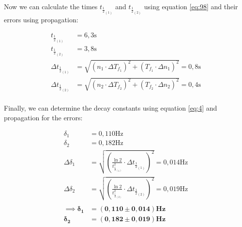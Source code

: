 \documentclass{article}
\begin{document}
Now we can calculate the times $t_{\frac{1}{2}_{(1)}}$ and $t_{\frac{1}{2}_{(2)}}$ using equation \ref{eq:98} and their errors using propagation:

\begin{equation}
    \begin{split}
        t_{\frac{1}{2}_{(1)}} &= 6,3 \text{s} \\
        t_{\frac{1}{2}_{(2)}} &= 3,8 \text{s} \\
        \Delta t_{\frac{1}{2}_{(1)}} &= \sqrt{(n_1 \cdot \Delta T_{f_1})^2 + (T_{f_1} \cdot \Delta n_1)^2} = 0,8 \text{s} \\
        \Delta t_{\frac{1}{2}_{(2)}} &= \sqrt{(n_2 \cdot \Delta T_{f_2})^2 + (T_{f_2} \cdot \Delta n_2)^2} = 0,4 \text{s} \\
    \end{split}
    \label{eq:95}
\end{equation}

Finally, we can determine the decay constants using equation \ref{eq:4} and propagation for the errors:

\begin{equation}
    \begin{split}
        \delta_1 &= 0,110 \text{Hz} \\
        \delta_2 &= 0,182 \text{Hz} \\ 
        \Delta \delta_1 &= \sqrt{\left( \frac{\ln{2}}{t_{\frac{1}{2}_{(1)}}^2} \cdot \Delta t_{\frac{1}{2}_{(1)}} \right)^2} = 0,014 \text{Hz} \\
        \Delta \delta_2 &= \sqrt{\left( \frac{\ln{2}}{t_{\frac{1}{2}_{(2)}}^2} \cdot \Delta t_{\frac{1}{2}_{(2)}} \right)^2} = 0,019 \text{Hz} \\ \\
        \implies \bm{\delta_1} &= \bm{(0,110 \pm 0,014)} \textbf{Hz} \\
        \bm{\delta_2} &= \bm{(0,182 \pm 0,019)} \textbf{Hz} \\
    \end{split}
    \label{eq:94}
\end{equation}
\end{document}
